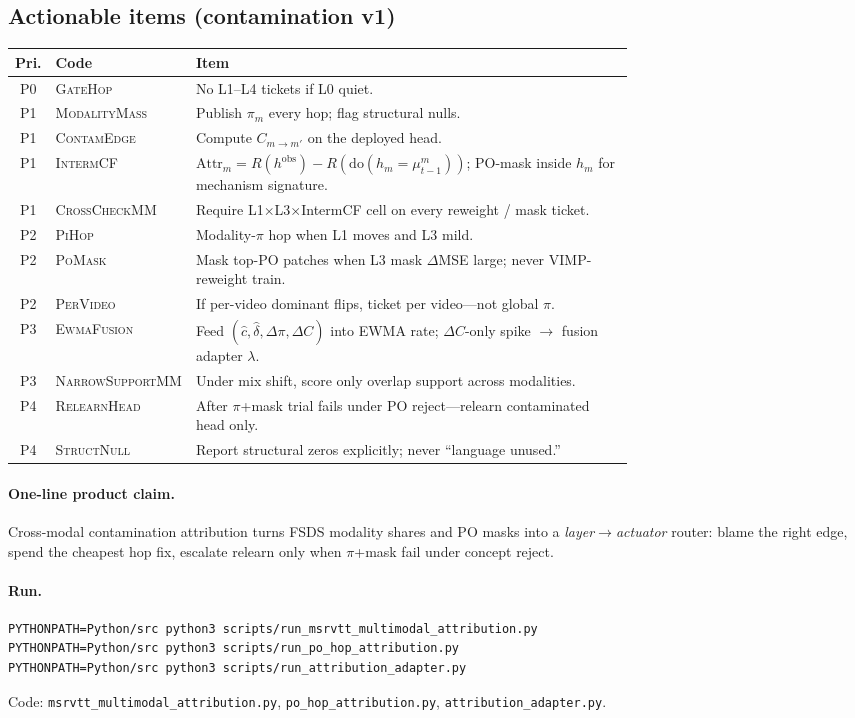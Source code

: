 \subsection{Actionable items (contamination v1)}
\begin{center}
\small
\begin{tabular}{@{}clp{0.72\linewidth}@{}}
\toprule
Pri. & Code & Item \\
\midrule
P0 & \textsc{GateHop} &
No L1--L4 tickets if L0 quiet. \\
P1 & \textsc{ModalityMass} &
Publish $\pi_m$ every hop; flag structural nulls. \\
P1 & \textsc{ContamEdge} &
Compute $C_{m\to m'}$ on the deployed head. \\
P1 & \textsc{IntermCF} &
$\mathrm{Attr}_m=R(h^{\mathrm{obs}})-R(\mathrm{do}(h_m=\mu_{t-1}^m))$; PO-mask inside $h_m$ for mechanism signature. \\
P1 & \textsc{CrossCheckMM} &
Require L1$\times$L3$\times$IntermCF cell on every reweight / mask ticket. \\
P2 & \textsc{PiHop} &
Modality-$\pi$ hop when L1 moves and L3 mild. \\
P2 & \textsc{PoMask} &
Mask top-PO patches when L3 mask $\Delta$MSE large; never VIMP-reweight train. \\
P2 & \textsc{PerVideo} &
If per-video dominant flips, ticket per video---not global $\pi$. \\
P3 & \textsc{EwmaFusion} &
Feed $(\hat c,\hat\delta,\Delta\pi,\Delta C)$ into EWMA rate; $\Delta C$-only spike $\to$ fusion adapter $\lambda$. \\
P3 & \textsc{NarrowSupportMM} &
Under mix shift, score only overlap support across modalities. \\
P4 & \textsc{RelearnHead} &
After $\pi$+mask trial fails under PO reject---relearn contaminated head only. \\
P4 & \textsc{StructNull} &
Report structural zeros explicitly; never ``language unused.'' \\
\bottomrule
\end{tabular}
\end{center}

\paragraph{One-line product claim.}
Cross-modal contamination attribution turns FSDS modality shares and PO masks
into a \emph{layer$\to$actuator} router: blame the right edge, spend the
cheapest hop fix, escalate relearn only when $\pi$+mask fail under concept
reject.

\paragraph{Run.}
\begin{verbatim}
PYTHONPATH=Python/src python3 scripts/run_msrvtt_multimodal_attribution.py
PYTHONPATH=Python/src python3 scripts/run_po_hop_attribution.py
PYTHONPATH=Python/src python3 scripts/run_attribution_adapter.py
\end{verbatim}
Code: \texttt{msrvtt\_multimodal\_attribution.py},
\texttt{po\_hop\_attribution.py},
\texttt{attribution\_adapter.py}.
